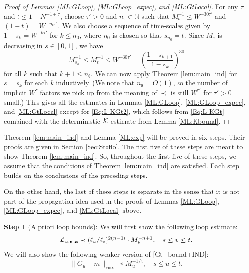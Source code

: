 \begin{proof}[Proof of Lemmas \ref{ML:GLoop}, \ref{ML:GLoop_expec},  and \ref{ML:GtLocal}]
For any $\tau$ and  $t \le 1-N^{-1+\tau}$,  choose $\tau'>0$ and $n_0 \in \mathbb N$ such that $M_{t}^{-1}\le  W^{- 30 \tau'}$ and $(1-t) = W^{-n_0 \tau'}$. We also choose a sequence of time-scales given by $1-s_{k} = W^{-k \tau'}$ for $ k \le n_0$, where $n_{0}$ is chosen so that $ s_{n_0}=t$. Since  $M_{s}$ is decreasing in  $s\in [0,1]$, we have 
   $$
M_{s_{k}}^{-1}\le M_{t}^{-1}\le W^{- 30\tau'}
= \left(\frac{1-s_{k+1}}{1-s_{k}}\right)^{30}
$$
for all $k$ such that  $k+1\le n_0$. We can now apply Theorem \ref{lem:main_ind} for $s=s_{k}$ for each $k$ inductively. (We note that $n_{0}=O(1)$, so the number of implicit $W^{\tau}$ factors we pick up from the meaning of $\prec$ is still $W^{\tau'}$ for $\tau'>0$ small.) This gives all the estimates in Lemmas \ref{ML:GLoop}, \ref{ML:GLoop_expec},  and \ref{ML:GtLocal} except for \eqref{Eq:L-KGt2}, which follows from \eqref{Eq:L-KGt} combined with the deterministic ${\cal K}$ estimate from Lemma \ref{ML:Kbound}.
\end{proof}


 
 
Theorem \ref{lem:main_ind} and Lemma \ref{ML:exp} will be proved in six steps. Their proofs are given in Section \ref{Sec:Stoflo}. The first five of these steps are meant to show Theorem \ref{lem:main_ind}. So, throughout the first five of these steps, we assume that the conditions of Theorem \ref{lem:main_ind} are satisfied. Each step builds on the conclusions of the preceding steps.

On the other hand, the last of these steps is separate in the sense that it is not part of the propagation idea used in the proofs of Lemmas \ref{ML:GLoop}, \ref{ML:GLoop_expec},  and \ref{ML:GtLocal} above.


\medskip 
\noindent 
\textbf{Step 1}   (A priori loop bounds): We will first show the following loop estimate:
 \begin{equation}\label{lRB1}
   {\cal L}_{u,\boldsymbol{\sigma}, \textbf{a}}\prec (\ell_u/\ell_s)^{2(n-1)}\cdot 
   M_{u}^{-n+1},\quad  s\le u\le t.
\end{equation}
We will also show the following weaker version of \eqref{Gt_bound+IND}:
\begin{equation}\label{Gtmwc}
    \|G_u-m\|_{\max}\prec  M_{u}^{-1/4},\quad s\le u\le t .
\end{equation} 
 





